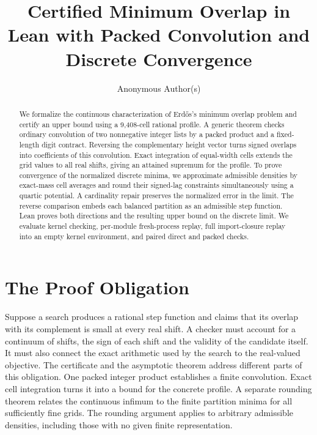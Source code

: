 \documentclass[sigplan,10pt,anonymous,review,balance=false]{acmart}
\begin{document}
\title[Certified Minimum Overlap in Lean]{Certified Minimum Overlap in Lean with Packed Convolution and Discrete Convergence}
\author{Anonymous Author(s)}

\begin{abstract}
We formalize the continuous characterization of Erd{\H{o}}s's minimum
overlap problem and certify an upper bound using a 9,408-cell
rational profile. A generic theorem checks ordinary convolution of
two nonnegative integer lists by a packed product and a fixed-length
digit contract. Reversing the complementary height vector turns
signed overlaps into coefficients of this convolution. Exact
integration of equal-width cells extends the grid values to all real
shifts, giving an attained supremum for the profile. To prove
convergence of the normalized discrete minima, we approximate
admissible densities by exact-mass cell averages and round their
signed-lag constraints simultaneously using a quartic potential.
A cardinality repair preserves the normalized error in the limit.
The reverse comparison embeds each balanced partition as an
admissible step function. Lean proves both directions and the
resulting upper bound on the discrete limit. We evaluate kernel
checking, per-module fresh-process replay, full import-closure
replay into an empty kernel environment, and paired direct and
packed checks.
\end{abstract}

\maketitle
\pagestyle{overlapreview}

\section{The Proof Obligation}
\label{sec:problem}

Suppose a search produces a rational step function and claims that
its overlap with its complement is small at every real shift. A
checker must account for a continuum of shifts, the sign of each
shift and the validity of the candidate itself. It must also connect
the exact arithmetic used by the search to the real-valued objective.
The certificate and the asymptotic theorem address different parts
of this obligation. One packed integer product establishes a finite
convolution. Exact cell integration turns it into a bound for the
concrete profile. A separate rounding theorem relates the continuous
infimum to the finite partition minima for all sufficiently fine
grids. The rounding argument applies to arbitrary admissible
densities, including those with no given finite representation.
\end{document}

